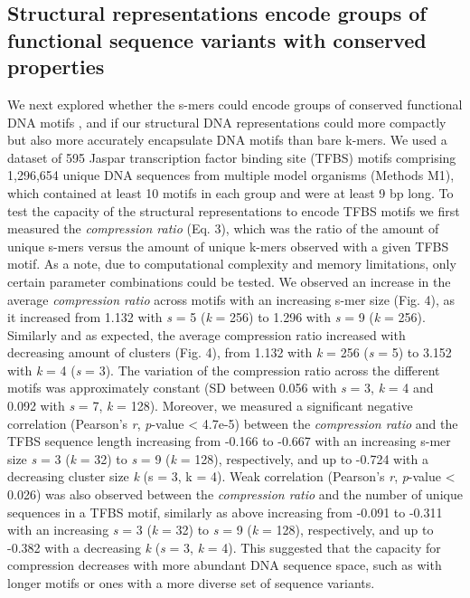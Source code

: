 \documentclass[10pt]{article}
\begin{document}
\subsection{Structural representations encode groups of functional sequence variants with conserved properties}
We next explored whether the s-mers could encode groups of conserved functional DNA motifs \cite{Levo2015-iu}, and if our structural DNA representations could more compactly but also more accurately encapsulate DNA motifs than bare k-mers. We used a dataset of 595 Jaspar \cite{Khan2018-wj} transcription factor binding site (TFBS) motifs comprising 1,296,654 unique DNA sequences from multiple model organisms (Methods M1), which contained at least 10 motifs in each group and were at least 9 bp long. To test the capacity of the structural representations to encode TFBS motifs we first measured the \textit{compression ratio} (Eq. 3), which was the ratio of the amount of unique s-mers versus the amount of unique k-mers observed with a given TFBS motif. As a note, due to computational complexity and memory limitations, only certain parameter combinations could be tested. We observed an increase in the average \textit{compression ratio} across motifs with an increasing s-mer size (Fig. 4), as it increased from 1.132 with \textit{s} = 5 (\textit{k} = 256) to 1.296 with \textit{s} = 9 (\textit{k} = 256). Similarly and as expected, the average compression ratio increased with decreasing amount of clusters (Fig. 4), from 1.132 with \textit{k} = 256 (\textit{s} = 5) to 3.152 with \textit{k} = 4 (\textit{s} = 3). The variation of the compression ratio across the different motifs was approximately constant (SD between 0.056 with \textit{s} = 3, \textit{k} = 4 and 0.092 with \textit{s} = 7, \textit{k} = 128). Moreover, we measured a significant negative correlation (Pearson's \textit{r}, \textit{p}-value \textless{} 4.7e-5) between the \textit{compression ratio} and the TFBS sequence length increasing from -0.166 to -0.667 with an increasing s-mer size \textit{s} = 3 (\textit{k} = 32) to \textit{s} = 9 (\textit{k} = 128), respectively, and up to -0.724 with a decreasing cluster size \textit{k} (s = 3, k = 4). Weak correlation (Pearson's \textit{r}, \textit{p}-value \textless{} 0.026) was also observed between the \textit{compression ratio} and the number of unique sequences in a TFBS motif, similarly as above increasing from -0.091 to -0.311 with an increasing \textit{s} = 3 (\textit{k} = 32) to \textit{s} = 9 (\textit{k} = 128), respectively, and up to -0.382 with a decreasing \textit{k} (\textit{s} = 3, \textit{k} = 4). This suggested that the capacity for compression decreases with more abundant DNA sequence space, such as with longer motifs or ones with a more diverse set of sequence variants.
\end{document}
